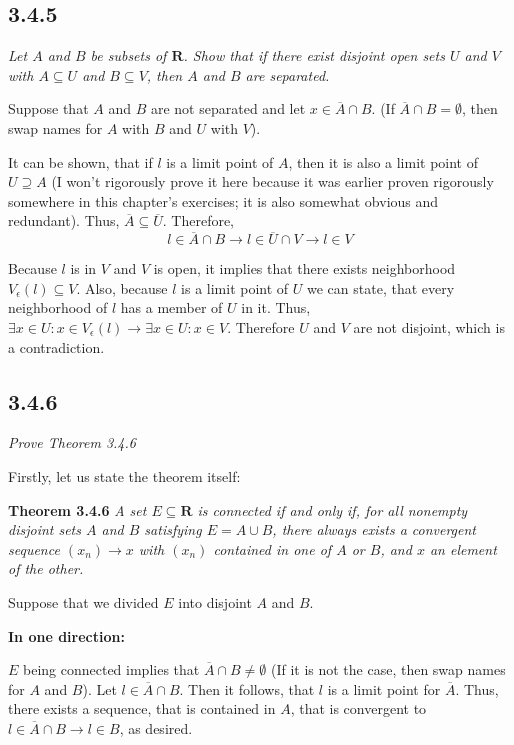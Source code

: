 \documentclass[11pt,oneside,titlepage]{book}
\begin{document}
\subsection*{3.4.5}
\textit{Let $A$ and $B$ be subsets of $\textbf{R}$. Show that if there exist
  disjoint open sets $U$ and $V$ with $A \subseteq U$ and $B \subseteq V$,
  then $A$ and $B$ are separated.}

Suppose that $A$ and $B$ are not separated and let $x \in \overline A \cap B$.
(If $\overline A \cap B = \emptyset$, then swap names for  $A$ with $B$ and
$U$ with $V$).

It can be shown, that if $l$ is a limit point of $A$, then it is also a limit
point of $U \supseteq A$ (I won't rigorously prove it here because it was
earlier proven rigorously somewhere in this chapter's exercises; it is
also somewhat obvious and redundant). Thus,
$\overline A \subseteq \overline U$. Therefore,
$$l \in \overline A \cap B \to l \in \overline U \cap V \to l \in V$$

Because $l$ is in $V$ and $V$ is open, it implies
that there exists neighborhood
$V_\epsilon(l) \subseteq V$. Also, because $l$ is a limit point of $U$ we
can state, that every neighborhood of $l$ has a member of $U$ in it.
Thus, $\exists x \in U: x \in V_\epsilon(l) \to
\exists x \in U: x \in V$. Therefore $U$ and $V$ are not disjoint, which is
a contradiction.

\subsection*{3.4.6}
\textit{Prove Theorem 3.4.6}

Firstly, let us state the theorem itself:

\textbf{Theorem 3.4.6}
\textit{A set $E \subseteq \textbf{R}$ is connected if and only if, for all
  nonempty disjoint sets $A$ and $B$ satisfying $E = A \cup B$, there always
  exists a convergent sequence $(x_n) \to x$ with $(x_n)$ contained in one of
  $A$ or $B$, and $x$ an element of the other.}

Suppose that we divided $E$ into disjoint $A$ and $B$.

\textbf{In one direction:}

$E$ being connected implies that $\overline A \cap B \neq \emptyset$ (If
it is not the case, then swap names for $A$ and $B$). Let
$l \in \overline A \cap B$. Then it follows, that $l$ is a limit point for
$\overline A$. Thus, there exists a sequence, that is contained in $A$,
that is convergent to $l \in \overline A \cap B \to l \in B$, as desired.
\end{document}
